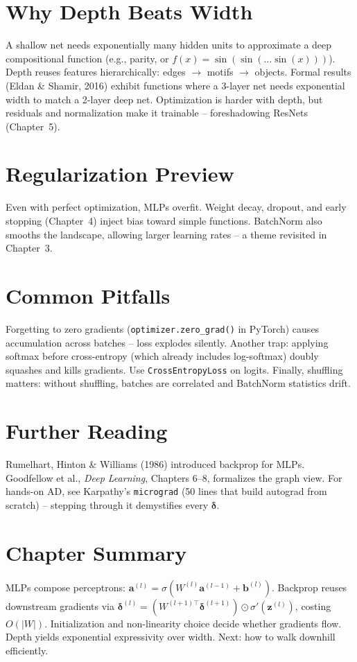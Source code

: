 \section{Why Depth Beats Width}
A shallow net needs exponentially many hidden units to approximate a deep
compositional function (e.g., parity, or $f(x)=\sin(\sin(\dots\sin(x)))$).
Depth reuses features hierarchically: edges $\to$ motifs $\to$ objects. Formal
results (Eldan \& Shamir, 2016) exhibit functions where a 3-layer net needs
exponential width to match a 2-layer deep net. Optimization is harder with depth,
but residuals and normalization make it trainable -- foreshadowing ResNets
(Chapter~5).

\section{Regularization Preview}
Even with perfect optimization, MLPs overfit. Weight decay, dropout, and early
stopping (Chapter~4) inject bias toward simple functions. BatchNorm also
smooths the landscape, allowing larger learning rates -- a theme revisited in
Chapter~3.

\section{Common Pitfalls}
Forgetting to zero gradients (\texttt{optimizer.zero\_grad()} in PyTorch) causes
accumulation across batches -- loss explodes silently. Another trap: applying
softmax before cross-entropy (which already includes log-softmax) doubly squashes
and kills gradients. Use \texttt{CrossEntropyLoss} on logits. Finally, shuffling
matters: without shuffling, batches are correlated and BatchNorm statistics
drift.

\section{Further Reading}
Rumelhart, Hinton \& Williams (1986) introduced backprop for MLPs. Goodfellow
et al., \emph{Deep Learning}, Chapters 6--8, formalizes the graph view. For
hands-on AD, see Karpathy's \texttt{micrograd} (50 lines that build autograd
from scratch) -- stepping through it demystifies every $\boldsymbol{\delta}$.

\section{Chapter Summary}
MLPs compose perceptrons: $\mathbf{a}^{(l)}=\sigma(W^{(l)}\mathbf{a}^{(l-1)}+
\mathbf{b}^{(l)})$. Backprop reuses downstream gradients via
$\boldsymbol{\delta}^{(l)}=(W^{(l+1)\top}\boldsymbol{\delta}^{(l+1)})\odot
\sigma'(\mathbf{z}^{(l)})$, costing $O(|W|)$. Initialization and non-linearity
choice decide whether gradients flow. Depth yields exponential expressivity over
width. Next: how to walk downhill efficiently.

